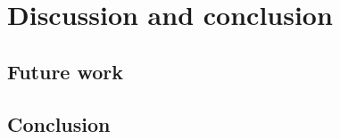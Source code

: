 \chapter{Discussion and conclusion}
\section{Future work}\label{sec:fw}
\section{Conclusion}\label{sec:concl}
